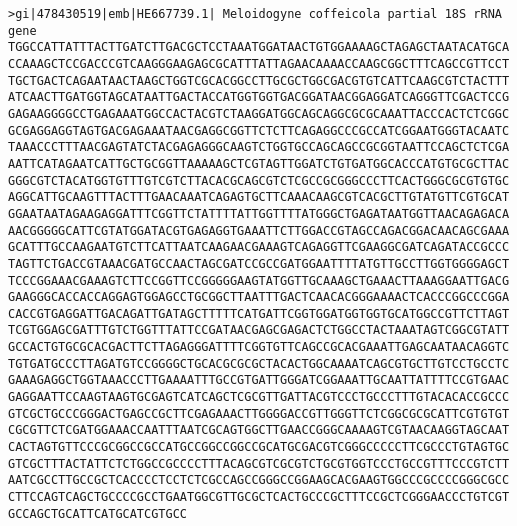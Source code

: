 \documentclass[11pt]{article}
\begin{document}
\begin{Verbatim}[commandchars=\\\{\}]
>gi|478430519|emb|HE667739.1| Meloidogyne coffeicola partial 18S rRNA gene
TGGCCATTATTTACTTGATCTTGACGCTCCTAAATGGATAACTGTGGAAAAGCTAGAGCTAATACATGCA
CCAAAGCTCCGACCCGTCAAGGGAAGAGCGCATTTATTAGAACAAAACCAAGCGGCTTTCAGCCGTTCCT
TGCTGACTCAGAATAACTAAGCTGGTCGCACGGCCTTGCGCTGGCGACGTGTCATTCAAGCGTCTACTTT
ATCAACTTGATGGTAGCATAATTGACTACCATGGTGGTGACGGATAACGGAGGATCAGGGTTCGACTCCG
GAGAAGGGGCCTGAGAAATGGCCACTACGTCTAAGGATGGCAGCAGGCGCGCAAATTACCCACTCTCGGC
GCGAGGAGGTAGTGACGAGAAATAACGAGGCGGTTCTCTTCAGAGGCCCGCCATCGGAATGGGTACAATC
TAAACCCTTTAACGAGTATCTACGAGAGGGCAAGTCTGGTGCCAGCAGCCGCGGTAATTCCAGCTCTCGA
AATTCATAGAATCATTGCTGCGGTTAAAAAGCTCGTAGTTGGATCTGTGATGGCACCCATGTGCGCTTAC
GGGCGTCTACATGGTGTTTGTCGTCTTACACGCAGCGTCTCGCCGCGGGCCCTTCACTGGGCGCGTGTGC
AGGCATTGCAAGTTTACTTTGAACAAATCAGAGTGCTTCAAACAAGCGTCACGCTTGTATGTTCGTGCAT
GGAATAATAGAAGAGGATTTCGGTTCTATTTTATTGGTTTTATGGGCTGAGATAATGGTTAACAGAGACA
AACGGGGGCATTCGTATGGATACGTGAGAGGTGAAATTCTTGGACCGTAGCCAGACGGACAACAGCGAAA
GCATTTGCCAAGAATGTCTTCATTAATCAAGAACGAAAGTCAGAGGTTCGAAGGCGATCAGATACCGCCC
TAGTTCTGACCGTAAACGATGCCAACTAGCGATCCGCCGATGGAATTTTATGTTGCCTTGGTGGGGAGCT
TCCCGGAAACGAAAGTCTTCCGGTTCCGGGGGAAGTATGGTTGCAAAGCTGAAACTTAAAGGAATTGACG
GAAGGGCACCACCAGGAGTGGAGCCTGCGGCTTAATTTGACTCAACACGGGAAAACTCACCCGGCCCGGA
CACCGTGAGGATTGACAGATTGATAGCTTTTTCATGATTCGGTGGATGGTGGTGCATGGCCGTTCTTAGT
TCGTGGAGCGATTTGTCTGGTTTATTCCGATAACGAGCGAGACTCTGGCCTACTAAATAGTCGGCGTATT
GCCACTGTGCGCACGACTTCTTAGAGGGATTTTCGGTGTTCAGCCGCACGAAATTGAGCAATAACAGGTC
TGTGATGCCCTTAGATGTCCGGGGCTGCACGCGCGCTACACTGGCAAAATCAGCGTGCTTGTCCTGCCTC
GAAAGAGGCTGGTAAACCCTTGAAAATTTGCCGTGATTGGGATCGGAAATTGCAATTATTTTCCGTGAAC
GAGGAATTCCAAGTAAGTGCGAGTCATCAGCTCGCGTTGATTACGTCCCTGCCCTTTGTACACACCGCCC
GTCGCTGCCCGGGACTGAGCCGCTTCGAGAAACTTGGGGACCGTTGGGTTCTCGGCGCGCATTCGTGTGT
CGCGTTCTCGATGGAAACCAATTTAATCGCAGTGGCTTGAACCGGGCAAAAGTCGTAACAAGGTAGCAAT
CACTAGTGTTCCCGCGGCCGCCATGCCGGCCGGCCGCATGCGACGTCGGGCCCCCTTCGCCCTGTAGTGC
GTCGCTTTACTATTCTCTGGCCGCCCCTTTACAGCGTCGCGTCTGCGTGGTCCCTGCCGTTTCCCGTCTT
AATCGCCTTGCCGCTCACCCCTCCTCTCGCCAGCCGGGCCGGAAGCACGAAGTGGCCCGCCCCGGGCGCC
CTTCCAGTCAGCTGCCCCGCCTGAATGGCGTTGCGCTCACTGCCCGCTTTCCGCTCGGGAACCCTGTCGT
GCCAGCTGCATTCATGCATCGTGCC


\end{Verbatim}
\end{document}
